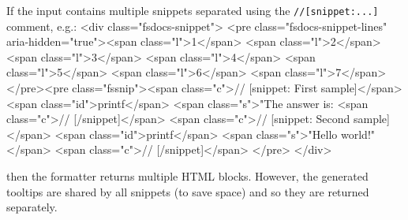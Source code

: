 \documentclass{article}
\begin{document}
If the input contains multiple snippets separated using the \texttt{//[snippet:...]} comment, e.g.:
<div class="fsdocs-snippet">
<pre class="fsdocs-snippet-lines" aria-hidden="true"><span class="l">1</span>
<span class="l">2</span>
<span class="l">3</span>
<span class="l">4</span>
<span class="l">5</span>
<span class="l">6</span>
<span class="l">7</span>
</pre><pre class="fssnip"><span class="c">// [snippet: First sample]</span>
<span class="id">printf</span> <span class="s">"The answer is: %
<span class="c">// [/snippet]</span>
<span class="c">// [snippet: Second sample]</span>
<span class="id">printf</span> <span class="s">"Hello world!"</span>
<span class="c">// [/snippet]</span>
</pre>
</div>


then the formatter returns multiple HTML blocks. However, the generated tooltips
are shared by all snippets (to save space) and so they are returned separately.
\end{document}
